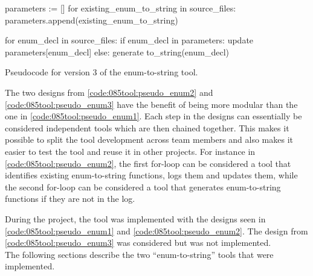 \begin{listing}[H]
    \begin{pythoncode}
parameters := []
for existing_enum_to_string in source_files:
    parameters.append(existing_enum_to_string)

for enum_decl in source_files:
    if enum_decl in parameters:
        update parameters[enum_decl]
    else:
        generate to_string(enum_decl)
    \end{pythoncode}
    \caption{Pseudocode for version 3 of the enum-to-string tool.}
    \label{code:085tool:pseudo_enum3}
\end{listing}

The two designs from \cref{code:085tool:pseudo_enum2} and \cref{code:085tool:pseudo_enum3} have the benefit of being more modular than the one in \ref{code:085tool:pseudo_enum1}.
Each step in the designs can essentially be considered independent tools which are then chained together. This makes it possible to split the tool development across team members and also makes it easier to test the tool and reuse it in other projects. For instance in \cref{code:085tool:pseudo_enum2}, the first for-loop can be considered a tool that identifies existing enum-to-string functions, logs them and updates them, while the second for-loop can be considered a tool that generates enum-to-string functions if they are not in the log.

During the project, the tool was implemented with the designs seen in \cref{code:085tool:pseudo_enum1} and \cref{code:085tool:pseudo_enum2}. The design from \cref{code:085tool:pseudo_enum3} was considered but was not implemented. \\The following sections describe the two ``enum-to-string'' tools that were implemented.
